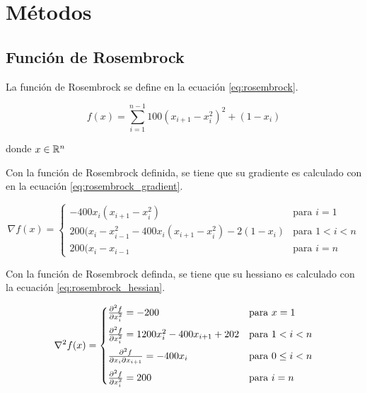 \pagebreak
\section{Métodos}

\subsection{Función de Rosembrock}

La función de Rosembrock se define en la ecuación \ref{eq:rosembrock}.

\begin{equation}
    f(x) = \sum_{i=1}^{n-1}  100(x_{i+1}-x_{i}^2)^2 +(1-x_i)
    \label{eq:rosembrock}
\end{equation}

donde $x\in \mathbb{R}^n$

Con la función de Rosembrock definida, se tiene que su gradiente es calculado con en la ecuación \ref{eq:rosembrock_gradient}.

\begin{equation}
    \nabla f (x) =\begin{cases}
        -400x_i(x_{i+1}-x_{i}^2)                              & \text{para } i=1   \\[0.25cm]
        200(x_{i}-x_{i-1}^2-400x_i(x_{i+1}-x_{i}^2) -2(1-x_i) & \text{para } 1<i<n \\[0.25cm]
        200(x_{i}-x_{i-1}                                     & \text{para } i=n
    \end{cases} \label{eq:rosembrock_gradient}
\end{equation}

Con la función de Rosembrock definda, se tiene que su hessiano es calculado con la ecuación \ref{eq:rosembrock_hessian}.

\begin{equation}
    \nabla^2 f(x)  = \begin{cases}
        \frac{\partial^2 f}{\partial x_i^2} = -200                    & \text{para } x=1         \\[0.25cm]
        \frac{\partial^2 f}{\partial x_i^2} =1200x_i^2-400x_{i+1}+202 & \text{para } 1<i<n       \\[0.25cm]
        \frac{\partial^2 f}{\partial x_i \partial x_{i+1}}  = -400x_i       & \text{para } 0\leq i < n \\[0.25cm]
        \frac{\partial^2 f}{\partial x_i^2} = 200                     & \text{para } i=n
    \end{cases}
    \label{eq:rosembrock_hessian}
\end{equation}

